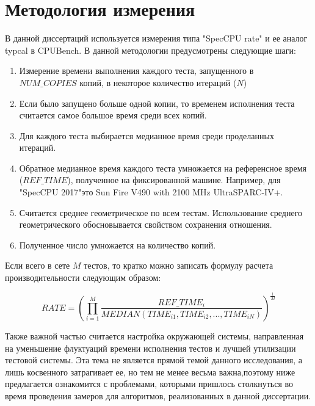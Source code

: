 \section{Методология измерения}\label{p1:method}
В данной диссертаций используется измерения типа  "SpecCPU rate" и ее аналог typcal в CPUBench. В данной методологии предусмотрены следующие шаги:
\begin{enumerate} 
		\item Измерение времени выполнения каждого теста, запущенного в $NUM\_COPIES$ копий, в некоторое количество итераций ($N$)
		\item Если было запущено больше одной копии, то временем исполнения теста считается самое большое время среди всех копий.
		\item Для каждого теста выбирается медианное время среди проделанных итераций. 
		\item Обратное медианное время каждого теста умножается на референсное время ($REF\_TIME$), полученное на фиксированной машине. Например, для "SpecCPU 2017"\phantom{ }это  Sun Fire V490 with 2100 MHz UltraSPARC-IV+.
		\item Считается среднее геометрическое по всем тестам. Использование среднего геометрического обосновывается свойством сохранения отношения.
		\item Полученное число умножается на количество копий.
\end{enumerate}
Если всего в сете $M$ тестов, то кратко можно записать формулу расчета производительности следующим образом:

$$RATE =\left(\prod _{i=1}^{M}\dfrac{REF\_TIME_i}{MEDIAN(TIME_{i1}, TIME_{i2}, ... , TIME_{iN})}\right)^{\frac {1}{M}} $$

Также важной частью считается настройка окружающей системы, направленная на уменьшение флуктуаций времени исполнения тестов и лучшей утилизации тестовой системы.
Эта тема не является прямой темой данного исследования, а лишь косвенного затрагивает ее, но тем не менее весьма важна,поэтому ниже предлагается ознакомится с проблемами, которыми пришлось столкнуться во  время проведения замеров для алгоритмов, реализованных в данной диссертации.  

